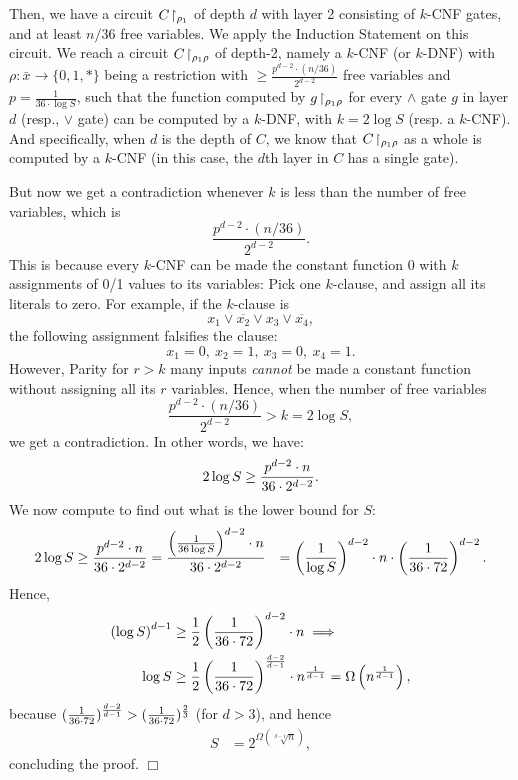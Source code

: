 Then, we have a circuit $C\!\upharpoonright_{\rho_1}$ of depth $d$ with layer 2 consisting of  $k$-CNF gates, and at least $n/36$ free variables. We   apply the Induction Statement on this circuit. We reach a circuit $C\!\upharpoonright_{\rho_1\rho}$ of depth-2, namely a $k$-CNF (or $k$-DNF) with
$\rho: \bar{x} \rightarrow\{0,1, *\}$ being a restriction
with $\geq \frac{p^{d-2} \cdot (n/36)}{2^{d-2}}$ free variables and $p=\frac{1}{36 \cdot \log S}$, such that the function computed by $g\!\upharpoonright_{\rho_1\rho}$ for every $\land$ gate $g$ in layer $d$ (resp., $\lor$ gate) can be computed by a $k$-DNF, with $k=2 \log S$ (resp. a $k$-CNF).
And specifically, when $d$ is the depth of $C$, we know that $C\!\upharpoonright_{\rho_1\rho}$ as a whole is computed by a $k$-CNF (in this case, the $d$th layer in $C$ has a single gate). 


But now we get a contradiction whenever \( k \) is less than the number of free variables, which is 
\[
\frac{p^{d-2} \cdot (n/36)}{2^{d-2}}.
\]
This is because every \( k \)-CNF can be made the  constant function 0 with \( k \) assignments of 0/1 values to its variables: Pick one \( k \)-clause, and assign all its literals to zero. For example, if the $k$-clause is 
\[
x_1 \lor \overline{x_2} \lor x_3 \lor \overline{x_4},
\]
 the following assignment falsifies the clause:  
\[
x_1 = 0, \ x_2 = 1, \ x_3 = 0, \ x_4 = 1.
\]
However, Parity for \( r > k \) many inputs \emph{cannot} be made a constant function without assigning all its \( r \) variables. Hence, when the number of free variables
\begin{equation}
\label{eq:660:327}
\frac{p^{d-2} \cdot (n/36)}{2^{d-2}} > k = 2 \log S,
\end{equation}
we get  a contradiction.
In other words, we have:
\[
2 \log S \geq \frac{p^{d-2} \cdot n}{36\cdot2^{d-2}}.
\]
We now compute to find out what is the lower bound for $S$:
\begin{align*}
    2 \log S &\ge  \frac{p^{d-2} \cdot n}{36\cdot2^{d-2}} 
 = \frac{\left(\frac{1}{36 \log S}\right)^{d-2} \cdot n}{36\cdot2^{d-2}} 
    & = \left(\frac{1}{\log S}\right)^{d-2} \cdot n \cdot \left(\frac{1}{36\cdot72}\right)^{d-2}.
\end{align*}
Hence, 
\begin{align*}
    \left(\log S\right)^{d-1} &\ge \frac{1}{2} \left(\frac{1}{36\cdot72}\right)^{d-2} \cdot n \implies \\
    \log S &\ge \frac{1}{2} \left(\frac{1}{36\cdot72}\right)^{\frac{d-2}{d-1}} \cdot n^{\frac{1}{d-1}}
= \Omega \left(n^{\frac{1}{d-1}}\right),
\end{align*}
because 
$(\frac{1}{36\cdot 72})^{\frac{d-2}{d-1}}
>
(
\frac{1}{36\cdot 72}
)^{\frac{2}{3}}$ (for $d>3$), and hence 
\begin{align*}
     S &=  2^{\Omega ({\sqrt[d-1]{n}})},
\end{align*}
concluding the proof. 
 \hfill $\Box$

